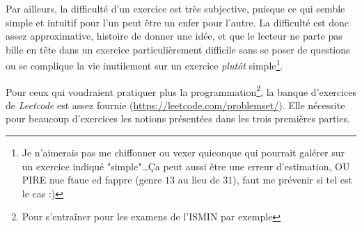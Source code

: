 \documentclass[../main.tex]{subfiles}
\begin{document}
Par ailleurs, la difficulté d'un exercice est très subjective, puisque ce qui semble simple et intuitif pour l'un peut être un enfer pour l'autre. La difficulté est donc assez approximative, histoire de donner une idée, et que le lecteur ne parte pas bille en tête dans un exercice particulièrement difficile sans se poser de questions ou se complique la vie inutilement sur un exercice \textit{plutôt} simple\footnote{Je n'aimerais pas me chiffonner ou vexer quiconque qui pourrait galérer sur un exercice indiqué "simple"\dots Ça peut aussi être une erreur d'estimation, OU PIRE nue ftaue ed fappre (genre $13$ au lieu de $31$), faut me prévenir si tel est le cas :)}.

Pour ceux qui voudraient pratiquer plus la programmation\footnote{Pour s'entraîner pour les examens de l'ISMIN par exemple}, la banque d'exercices de \textit{Leetcode} est assez fournie (\url{https://leetcode.com/problemset/}). Elle nécessite pour beaucoup d'exercices les notions présentées dans les trois premières parties.
\newpage
\end{document}
